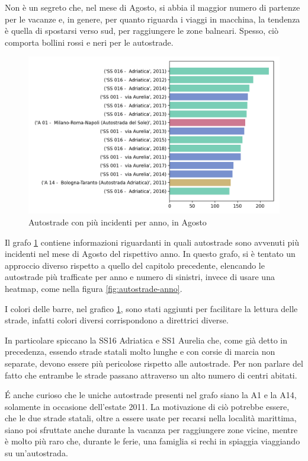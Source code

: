 \documentclass[a4paper,12pt]{report}
\begin{document}
Non è un segreto che, nel mese di Agosto, si abbia il maggior numero di 
partenze per le vacanze e, in genere, per quanto riguarda i viaggi 
in macchina, la tendenza è quella di spostarsi verso sud, 
per raggiungere le zone balneari.
Spesso, ciò comporta bollini rossi e neri per le autostrade. 

\begin{figure}
    \includegraphics[width=\linewidth]{../src/incidenti/incidenti_aci/agosto/autostrade_anno_agosto.png}
    \caption{Autostrade con più incidenti per anno, in Agosto}
    \label{fig:autostrade-anno-agosto}
\end{figure}

Il grafo \ref{fig:autostrade-anno-agosto} contiene informazioni riguardanti 
in quali autostrade sono avvenuti più incidenti nel mese di Agosto del rispettivo anno. 
In questo grafo, si è tentato un approccio diverso rispetto a quello del capitolo precedente, 
elencando le autostrade più trafficate per anno e numero di sinistri, invece di usare una 
heatmap, come nella figura \ref{fig:autostrade-anno}.

I colori delle barre, nel grafico \ref{fig:autostrade-anno-agosto}, sono stati aggiunti per 
facilitare la lettura delle strade, infatti colori diversi corrispondono a direttrici diverse. 

In particolare spiccano la SS16 Adriatica e SS1 Aurelia che, come già 
detto in precedenza, essendo strade statali molto lunghe e con corsie di marcia 
non separate, devono essere più pericolose rispetto alle autostrade.
Per non parlare del fatto che entrambe le strade passano attraverso un 
alto numero di centri abitati.

\'E anche curioso che le uniche autostrade presenti nel grafo siano la A1 e la A14, 
solamente in occasione dell'estate 2011. 
La motivazione di ciò potrebbe essere, che le due strade statali, oltre a essere usate per 
recarsi nella località marittima, siano poi sfruttate anche durante la vacanza per 
raggiungere zone vicine, mentre è molto più raro che, durante le ferie, una famiglia 
si rechi in spiaggia viaggiando su un'autostrada.
\end{document}

